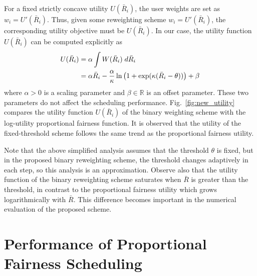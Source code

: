 \documentclass[journal,12pt,onecolumn,draftclsnofoot,]{IEEEtran}
\begin{document}
For a fixed {strictly concave} utility $U(\bar R_i)$, the user weights are set
as $w_i=U'(\bar R_i)$.  Thus, given some reweighting scheme $w_i=U'(\bar R_i)$,
the corresponding utility objective must be $U(\bar R_i)$. 
In our case, the utility function $U(\bar R_i)$ can be computed explicitly as
\begin{align}
\label{binary_utility}
U(\bar R_i) &= \alpha\int W(\bar R_i)\;d\bar R_i\notag\\
&= \alpha\bar R_i - \frac{\alpha}{\kappa}\ln\left(1+\exp(\kappa(\bar R_i-\theta))\right)+\beta
\end{align}
where $\alpha>0$ is a scaling parameter and $\beta\in\mathbb R$ is an offset
parameter. These two parameters do not affect the scheduling performance.
Fig.~\ref{fig:new_utility} compares the utility function $U(\bar R_i)$ of the
binary weighting scheme with the log-utility proportional fairness function. It
is observed that the utility of the fixed-threshold scheme follows the
same trend as the proportional fairness utility.

Note that the above simplified analysis assumes that the threshold $\theta$ is
fixed, but in the proposed binary reweighting scheme, the threshold changes
adaptively in each step, so this analysis is an approximation. Observe also that the utility function of the binary reweighting scheme
saturates when $\bar R$ is greater than the threshold, in contrast to the proportional
fairness utility which grows logarithmically with $\bar R$. This difference
becomes important in the numerical evaluation of the proposed scheme.


\section{Performance of Proportional Fairness Scheduling}
\label{sec:logutileval}
\end{document}
